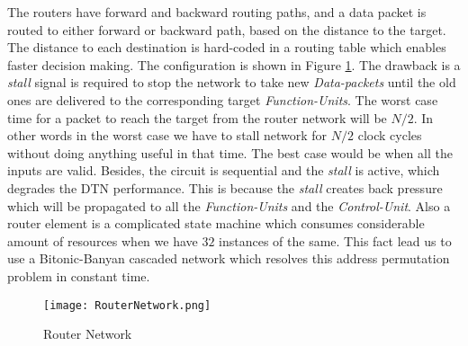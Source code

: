 					      
					      The routers have forward and backward routing paths, and a data packet is routed to either forward or backward path, based on the distance to the target. The distance to each destination is hard-coded 
					      in a routing table which enables faster decision making. The configuration is shown in Figure \ref{fig:RouterNetwork}. The drawback is a \textit{stall} signal is required
					      to stop the network to take new  \textit{Data-packets} until the old ones are delivered to the corresponding target  \textit{Function-Units}. The worst case time for a packet to reach the target
					      from the router network will be $N / 2$. In other words in the worst case we have to stall network for $N/2$ clock cycles without doing anything useful in that time. The best
					      case would be when all the inputs are valid. Besides, the circuit is sequential and the \textit{stall} is active, which degrades the DTN performance. This is because the \textit{stall} creates back pressure which
					      will be propagated to all the \textit{Function-Units} and the \textit{Control-Unit}. Also a router element is a complicated state machine which consumes considerable amount of resources when we have $32$ instances of the same. 
					      This fact lead us to use a Bitonic-Banyan\cite{batcher_banyan_ref} cascaded network which resolves this address permutation problem in constant time.
					      \begin{figure}[!ht]
							\texttt{[image: RouterNetwork.png]}
						      \caption{Router Network}
					      \label{fig:RouterNetwork}
					      \end{figure}
